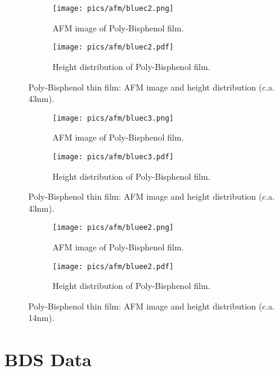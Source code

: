 \begin{figure}[!htb]
\centering
\begin{subfigure}[t]{.5\textwidth}
  \centering
  \texttt{[image: pics/afm/bluec2.png]}
  \caption{AFM image of Poly-Bisphenol film.}
  \label{PolyBisphenol_AFM}
\end{subfigure}%
\begin{subfigure}[t]{.5\textwidth}
  \centering
  \texttt{[image: pics/afm/bluec2.pdf]}
  \caption{Height distribution of Poly-Bisphenol film.}
  \label{PolyBisphenol_HeightDist}
\end{subfigure}
\caption{Poly-Bisphenol thin film: AFM image and height distribution (c.a. 43nm).}
\end{figure}

\begin{figure}[!htb]
\centering
\begin{subfigure}[t]{.5\textwidth}
  \centering
  \texttt{[image: pics/afm/bluec3.png]}
  \caption{AFM image of Poly-Bisphenol film.}
  \label{PolyBisphenol_AFM}
\end{subfigure}%
\begin{subfigure}[t]{.5\textwidth}
  \centering
  \texttt{[image: pics/afm/bluec3.pdf]}
  \caption{Height distribution of Poly-Bisphenol film.}
  \label{PolyBisphenol_HeightDist}
\end{subfigure}
\caption{Poly-Bisphenol thin film: AFM image and height distribution (c.a. 43nm).}
\end{figure}


\begin{figure}[!htb]
\centering
\begin{subfigure}[t]{.5\textwidth}
  \centering
  \texttt{[image: pics/afm/bluee2.png]}
  \caption{AFM image of Poly-Bisphenol film.}
  \label{PolyBisphenol_AFM}
\end{subfigure}%
\begin{subfigure}[t]{.5\textwidth}
  \centering
  \texttt{[image: pics/afm/bluee2.pdf]}
  \caption{Height distribution of Poly-Bisphenol film.}
  \label{PolyBisphenol_HeightDist}
\end{subfigure}
\caption{Poly-Bisphenol thin film: AFM image and height distribution (c.a. 14nm).}
\end{figure}

\chapter{BDS Data}


